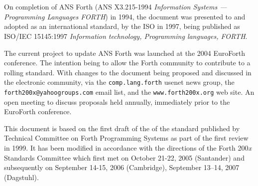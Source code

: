 \chapter*{}
\label{foreword}

\cbstart
{}

On completion of ANS Forth (ANS X3.215-1994 \emph{Information Systems
--- Programming Languages FORTH}) in 1994, the document was presented
to and adopted as an international standard, by the ISO in 1997, being
published as ISO/IEC 15145:1997 \emph{Information technology,
Programming languages, FORTH}.

The current project to update ANS Forth was launched at the 2004
EuroForth conference.  The intention being to allow the Forth community
to contribute to a rolling standard.  With changes to the document
being proposed and discussed in the electronic community, via the
\texttt{comp.lang.forth} usenet news group, the
\texttt{forth200x@yahoogroups.com} email list, and the
\texttt{www.forth200x.org} web site.  An open meeting to discuss
proposals  held annually, immediately prior to the EuroForth
conference.

This document is based on the first draft of the of the standard
published by Technical Committee on Forth Programming Systems as part
of the first review in 1999. It has been modified in accordance with
the directions of the Forth 200\emph{x} Standards Committee which first
met on October 21-22, 2005 (Santander) and subsequently on
September 14-15, 2006 (Cambridge),
September 13--14, 2007 (Dagstuhl).
\cbend
